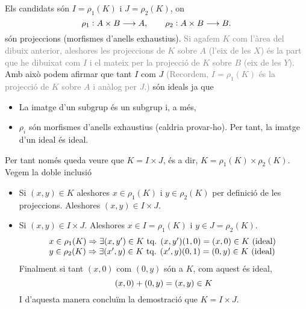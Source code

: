 \documentclass[../main.tex]{subfiles}
\begin{document}
\begin{sol}
\begin{enumerate}[(a)]
    Els candidats són $I=\rho_1(K)$ i $J=\rho_2(K)$, on 
    \begin{equation}
        \notag
        \rho_1:A\times B \longrightarrow A, \qquad \rho_2:A\times B\longrightarrow B.
    \end{equation}
    són projeccions (morfismes d'anells exhaustius). \textcolor{gray}{Si agafem $K$ com l'àrea del dibuix anterior, aleshores les projeccions de $K$ sobre $A$ (l'eix de les $X$) és la part que he dibuixat com $I$ i el mateix per la projecció de $K$ sobre $B$ (eix de les $Y$).} Amb això podem afirmar que tant $I$ com $J$ \textcolor{gray}{(Recordem, $I=\rho_1(K)$ és la projecció de $K$ sobre $A$ i anàlog per $J$.)} són ideals ja que
    \begin{itemize}
        \item La imatge d'un subgrup és un subgrup i, a més, 
        \item $\rho_i$ són morfismes d'anells exhaustius (caldria provar-ho). Per tant, la imatge d'un ideal és ideal.
    \end{itemize}
    Per tant només queda veure que $K=I\times J$, és a dir, $K=\rho_1(K)\times \rho_2(K)$. Vegem la doble inclusió
    \begin{itemize}
        \item \fbox{$\subseteq$} Si $(x,y)\in K$ aleshores $x\in \rho_1(K)$ i $y\in \rho_2(K)$ per definició de les projeccions. Aleshores $(x,y)\in I\times J$.
        \item \fbox{$\supseteq$} Si $(x,y)\in I\times J$. Aleshores $x\in I = \rho_1(K)$ i $y\in J=\rho_2(K)$.
        \begin{equation}
            \notag
            \begin{array}{ll}
                 x\in \rho_1(K) \Rightarrow \exists (x,y')\in K\text{ tq. } (x,y')(1,0)=(x,0)\in K\text{ (ideal) } \\
                 y\in \rho_2(K) \Rightarrow \exists (x',y)\in K\text{ tq. } (x',y)(0,1)=(0,y)\in K\text{ (ideal) } \\
            \end{array}
        \end{equation}
        Finalment si tant $(x,0)$ com $(0,y)$ són a $K$, com aquest és ideal, 
        \begin{equation}
            \notag
            (x,0)+(0,y)=(x,y)\in K
        \end{equation}
        I d'aquesta manera concluïm la demostració que $K=I\times J$.
    \end{itemize}
    

\end{enumerate}
\end{sol}
\end{document}
